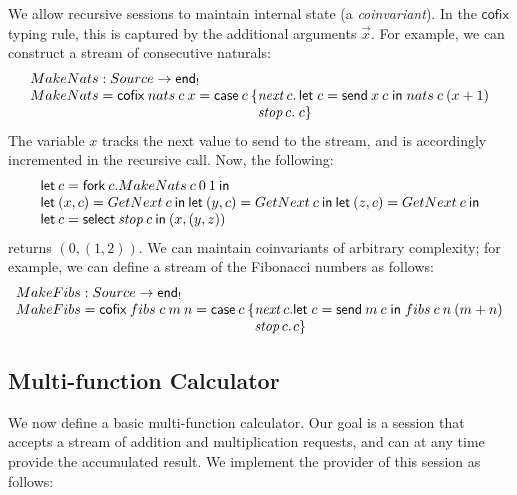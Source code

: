 \documentclass[orivec,envcountsame]{llncs}
\makeatletter
\newcommand{\uto}{\ensuremath{\rightarrow}}
\newcommand{\outterm}{\mkwd{end}_!}
\newcommand{\mkwd}[1]{\mathsf{#1}}
\newcommand{\clabel}[1]{\mathit{#1}}
\newcommand{\gvsend}[2]{\mkwd{send}\:#1\:#2}
\newcommand{\gvlet}[3]{\mkwd{let}\;#1 = #2\;\mkwd{in}\;#3}
\newcommand{\gvselect}[2]{\mkwd{select}\:#1\:#2}
\newcommand{\gvfork}[2]{\mkwd{fork}\:#1.#2}
\newcommand{\lrkwd}{\mkwd{cofix}}
\newcommand{\key}{\mkwd}
\newcommand{\cofix}{\lrkwd}
\newcommand{\ba}{\begin{array}}
\newcommand{\ea}{\end{array}}
\newcommand{\bl}{\ba[t]{@{}l@{}}}
\newcommand{\el}{\ea}
\makeatother
\begin{document}
We allow recursive sessions to maintain internal state (a \emph{coinvariant}). In the $\cofix$
typing rule, this is captured by the additional arguments $\vec{x}$. For example, we can construct a
stream of consecutive naturals:
\small\[
\bl
  MakeNats : Source \uto \outterm \\
  MakeNats = \cofix\:nats\:c\:x = \mkwd{case}\:c\:\{
    \ba[t]{@{}l@{}l@{}}
    \clabel{next}\,c.&\,\gvlet{c}{\gvsend{x}{c}}{nats\:c\:(x+1)} \\
    \clabel{stop}\,c.&\,c\} \\
    \ea
\el
\]\normalsize
The variable $x$ tracks the next value to send to the stream, and is accordingly incremented in the
recursive call. Now, the following:
\small\[
\bl
\key{let}\:c = \gvfork{c}{MakeNats\:c\:0\:1}\:\key{in} \\
\key{let}\:(x, c) = GetNext\:c\:\key{in}\:
\key{let}\:(y, c) = GetNext\:c\:\key{in}\:
\key{let}\:(z, c) = GetNext\:c\:\key{in} \\
\key{let}\:c = \gvselect{\clabel{stop}}{c}\:\key{in}\:(x,(y,z)) \\
\el
\]\normalsize
returns $(0, (1, 2))$.
%
We can maintain coinvariants of arbitrary complexity; for example, we can define a
stream of the Fibonacci numbers as follows:
\small\[
\bl
  MakeFibs : Source \uto \outterm \\
  MakeFibs = \cofix\:fibs\;c\:m\:n = \mkwd{case}\:c\:\{
    \ba[t]{@{}l@{}l@{}}
    \clabel{next}\,c.& \gvlet{c}{\gvsend{m}{c}}{fibs\:c\:n\:(m+n)} \\
    \clabel{stop}\,c.& c\} \\
    \ea
\el
\]\normalsize

\subsection{Multi-function Calculator}

We now define a basic multi-function calculator. Our goal is a session that accepts a stream of
addition and multiplication requests, and can at any time provide the accumulated result. We
implement the provider of this session as follows:
\end{document}
